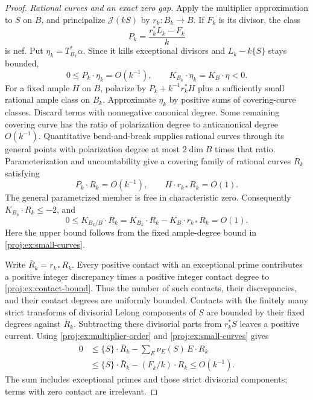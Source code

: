 \begin{proof}
\smallskip
\noindent\emph{Rational curves and an exact zero gap.}
Apply the multiplier approximation to \(S\) on \(B\), and
principalize \(\mathcal J(kS)\) by \(r_k:B_k\to B\).
If \(F_k\) is its divisor, the class
\[
 P_k=\frac{r_k^*L_k-F_k}{k}
\]
is nef. Put \(\eta_k=T_{B_k}^*\alpha\). Since it kills
exceptional divisors and \(L_k-k\{S\}\) stays bounded,
\[
 0\leq P_k\cdot\eta_k=O(k^{-1}),\qquad
 K_{B_k}\cdot\eta_k=K_B\cdot\eta<0.
\]
For a fixed ample \(H\) on \(B\), polarize by
\(P_k+k^{-1}r_k^*H\) plus a sufficiently small rational ample
class on \(B_k\). Approximate \(\eta_k\) by positive sums of
covering-curve classes. Discard terms with nonnegative
canonical degree. Some remaining covering curve has the ratio
of polarization degree to anticanonical degree \(O(k^{-1})\).
Quantitative bend-and-break
\cite[Theorem~5]{Proj-MiyaokaMori1986} supplies rational curves
through its general points with polarization degree at most
\(2\dim B\) times that ratio. Parameterization and
uncountability give a covering family of rational curves
\(R_k\) satisfying
\begin{equation}\label{proj:ex:small-curves}
 P_k\cdot R_k=O(k^{-1}),\qquad
 H\cdot r_{k*}R_k=O(1).
\end{equation}
The general parametrized member is free in characteristic
zero. Consequently \(K_{B_k}\cdot R_k\leq-2\), and
\begin{equation}\label{proj:ex:contact-bound}
 0\leq K_{B_k/B}\cdot R_k
   =K_{B_k}\cdot R_k-K_B\cdot r_{k*}R_k=O(1).
\end{equation}
Here the upper bound follows from the fixed ample-degree
bound in \eqref{proj:ex:small-curves}.

Write \(\bar R_k=r_{k*}R_k\). Every positive contact with an
exceptional prime contributes a positive integer discrepancy
times a positive integer contact degree to
\eqref{proj:ex:contact-bound}. Thus the number of such contacts,
their discrepancies, and their contact degrees are uniformly
bounded. Contacts with the finitely many strict transforms
of divisorial Lelong components of \(S\) are bounded by their
fixed degrees against \(\bar R_k\). Subtracting these
divisorial parts from \(r_k^*S\) leaves a positive current.
Using \eqref{proj:ex:multiplier-order} and
\eqref{proj:ex:small-curves} gives
\begin{equation}\label{proj:ex:zero-gap}
 \begin{split}
 0&\leq \{S\}\cdot\bar R_k
          -\sum_E\nu_E(S)\,E\cdot R_k\\
  &\leq \{S\}\cdot\bar R_k-(F_k/k)\cdot R_k
   \leq O(k^{-1}).
 \end{split}
\end{equation}
The sum includes exceptional primes and those strict
divisorial components; terms with zero contact are irrelevant.


\end{proof}

